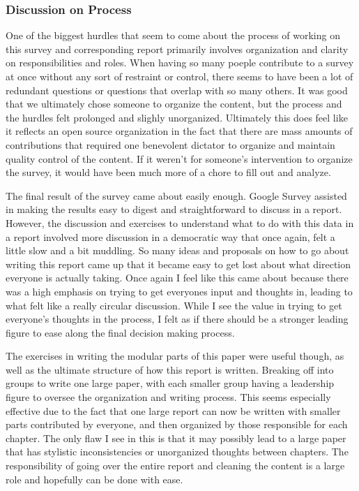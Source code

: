 \subsubsection{Discussion on Process}

One of the biggest hurdles that seem to come about the process of working on this survey and corresponding report primarily involves organization and clarity on responsibilities and roles. When having so many poeple contribute to a survey at once without any sort of restraint or control, there seems to have been a lot of redundant questions or questions that overlap with so many others. It was good that we ultimately chose someone to organize the content, but the process and the hurdles felt prolonged and slighly unorganized. Ultimately this does feel like it reflects an open source organization in the fact that there are mass amounts of contributions that required one benevolent dictator to organize and maintain quality control of the content. If it weren't for someone's intervention to organize the survey, it would have been much more of a chore to fill out and analyze. 

The final result of the survey came about easily enough. Google Survey assisted in making the results easy to digest and straightforward to discuss in a report. However, the discussion and exercises to understand what to do with this data in a report involved more discussion in a democratic way that once again, felt a little slow and a bit muddling. So many ideas and proposals on how to go about writing this report came up that it became easy to get lost about what direction everyone is actually taking. Once again I feel like this came about because there was a high emphasis on trying to get everyones input and thoughts in, leading to what felt like a really circular discussion. While I see the value in trying to get everyone's thoughts in the process, I felt as if there should be a stronger leading figure to ease along the final decision making process. 

The exercises in writing the modular parts of this paper were useful though, as well as the ultimate structure of how this report is written. Breaking off into groups to write one large paper, with each smaller group having a leadership figure to oversee the organization and writing process. This seems especially effective due to the fact that one large report can now be written with smaller parts contributed by everyone, and then organized by those responsible for each chapter. The only flaw I see in this is that it may possibly lead to a large paper that has stylistic inconsistencies or unorganized thoughts between chapters. The responsibility of going over the entire report and cleaning the content is a large role and hopefully can be done with ease. 

